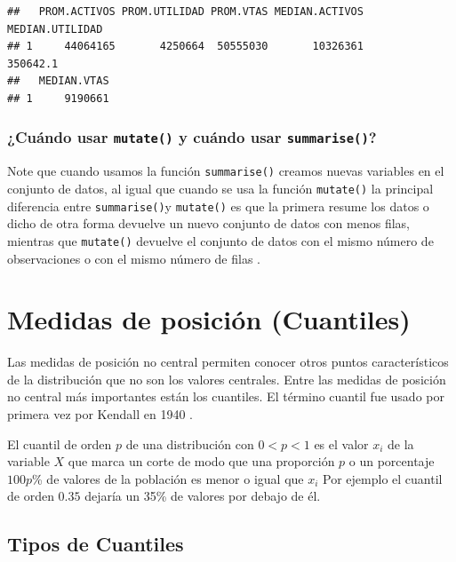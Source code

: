 \documentclass[
]{krantz}
\begin{document}
\begin{verbatim}
##   PROM.ACTIVOS PROM.UTILIDAD PROM.VTAS MEDIAN.ACTIVOS MEDIAN.UTILIDAD
## 1     44064165       4250664  50555030       10326361        350642.1
##   MEDIAN.VTAS
## 1     9190661
\end{verbatim}

\hypertarget{cuando-usar-mutate-y-cuando-usar-summarise}{%
\subsubsection{\texorpdfstring{¿Cuándo usar \texttt{mutate()} y cuándo usar \texttt{summarise()}?}{¿Cuándo usar mutate() y cuándo usar summarise()?}}\label{cuando-usar-mutate-y-cuando-usar-summarise}}

Note que cuando usamos la función \texttt{summarise()} creamos nuevas variables en el conjunto de datos, al igual que cuando se usa la función \texttt{mutate()} la principal diferencia entre \texttt{summarise()}y \texttt{mutate()} es que la primera resume los datos o dicho de otra forma devuelve un nuevo conjunto de datos con menos filas, mientras que \texttt{mutate()} devuelve el conjunto de datos con el mismo número de observaciones o con el mismo número de filas \citep{msdr2017}.

\hypertarget{medidas-de-posicion-cuantiles}{%
\section{Medidas de posición (Cuantiles)}\label{medidas-de-posicion-cuantiles}}

Las medidas de posición no central permiten conocer otros puntos característicos de la distribución que no son los valores centrales. Entre las medidas de posición no central más importantes están los cuantiles. El término cuantil fue usado por primera vez por Kendall en 1940 \citep{zurita2010}.

El cuantil de orden \(p\) de una distribución con \(0<p<1\) es el valor \(x_{i}\) de la variable \(X\) que marca un corte de modo que una proporción \(p\) o un porcentaje \(100p\)\% de valores de la población es menor o igual que \(x_{i}\) Por ejemplo el cuantil de orden \(0.35\) dejaría un 35\% de valores por debajo de él.

\hypertarget{tipos-de-cuantiles}{%
\subsection{Tipos de Cuantiles}\label{tipos-de-cuantiles}}
\end{document}
